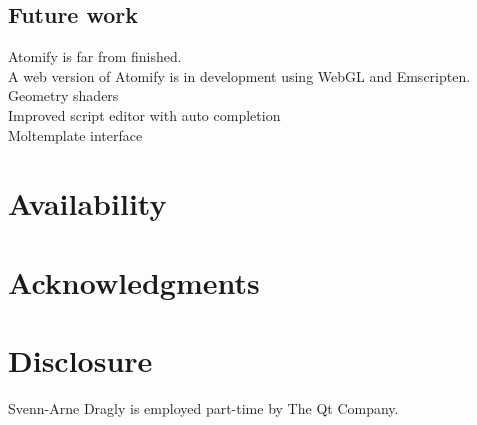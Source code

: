\documentclass[aps,pre,twocolumn,letterpaper,floatfix,nofootinbib]{revtex4}
\begin{document}
\subsection{Future work}
Atomify is far from finished.\\
A web version of Atomify is in development using WebGL and Emscripten. \\
Geometry shaders \\
Improved script editor with auto completion \\
Moltemplate interface \\

\section{Availability}

\section{Acknowledgments}

\section{Disclosure}

Svenn-Arne Dragly is employed part-time by The Qt Company.


\end{document}
